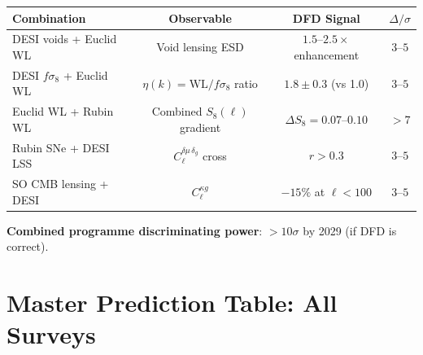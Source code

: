 \documentclass[11pt,a4paper]{article}
\begin{document}
\begin{center}
\begin{tabular}{lccc}
\toprule
\textbf{Combination} & \textbf{Observable} &
\textbf{DFD Signal} & \textbf{$\Delta/\sigma$} \\
\midrule
DESI voids + Euclid WL & Void lensing ESD & $1.5$--$2.5\times$
  enhancement & $3$--$5$ \\
DESI $f\sigma_8$ + Euclid WL & $\eta(k) = \text{WL}/f\sigma_8$ ratio
  & $1.8 \pm 0.3$ (vs 1.0) & $3$--$5$ \\
Euclid WL + Rubin WL & Combined $S_8(\ell)$ gradient & $\Delta S_8
  = 0.07$--$0.10$ & $> 7$ \\
Rubin SNe + DESI LSS & $C_\ell^{\delta\mu\,\delta_g}$ cross & $r > 0.3$
  & $3$--$5$ \\
SO CMB lensing + DESI & $C_\ell^{\kappa g}$ & $-15\%$ at $\ell < 100$
  & $3$--$5$ \\
\bottomrule
\end{tabular}
\end{center}

\textbf{Combined programme discriminating power}: $> 10\sigma$ by 2029
(if DFD is correct).


\section{Master Prediction Table: All Surveys}
\label{sec:master}
\end{document}
